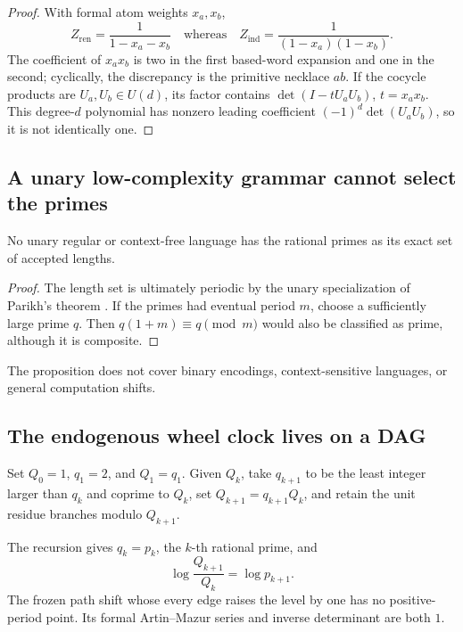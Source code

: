 \begin{proof}
With formal atom weights \(x_a,x_b\),
\[
  Z_{\mathrm{ren}}=\frac{1}{1-x_a-x_b}
  \quad\text{whereas}\quad
  Z_{\mathrm{ind}}=\frac{1}{(1-x_a)(1-x_b)}.
\]
The coefficient of \(x_ax_b\) is two in the first based-word expansion and one
in the second; cyclically, the discrepancy is the primitive necklace \(ab\).
If the cocycle products are \(U_a,U_b\in U(d)\), its factor contains
\(\det(I-tU_aU_b)\), \(t=x_ax_b\).  This degree-\(d\) polynomial has nonzero
leading coefficient \((-1)^d\det(U_aU_b)\), so it is not identically one.
\end{proof}

\subsection{A unary low-complexity grammar cannot select the primes}

\begin{proposition}
\label{prop:unary}
No unary regular or context-free language has the rational primes as its exact
set of accepted lengths.
\end{proposition}

\begin{proof}
The length set is ultimately periodic by the unary specialization of Parikh's
theorem \citep{esparza2011parikh}.  If the primes had eventual period \(m\),
choose a sufficiently large prime \(q\).  Then \(q(1+m)\equiv q\pmod m\)
would also be classified as prime, although it is composite.
\end{proof}

The proposition does not cover binary encodings, context-sensitive languages,
or general computation shifts.

\subsection{The endogenous wheel clock lives on a DAG}

Set \(Q_0=1\), \(q_1=2\), and \(Q_1=q_1\).  Given \(Q_k\), take
\(q_{k+1}\) to be the least integer
larger than \(q_k\) and coprime to \(Q_k\), set
\(Q_{k+1}=q_{k+1}Q_k\), and retain the unit residue branches modulo
\(Q_{k+1}\).

\begin{proposition}
\label{prop:wheel}
The recursion gives \(q_k=p_k\), the \(k\)-th rational prime, and
\[
  \log\frac{Q_{k+1}}{Q_k}=\log p_{k+1}.
\]
The frozen path shift whose every edge raises the level by one has no
positive-period point.  Its formal Artin--Mazur series and inverse determinant
are both \(1\).
\end{proposition}

